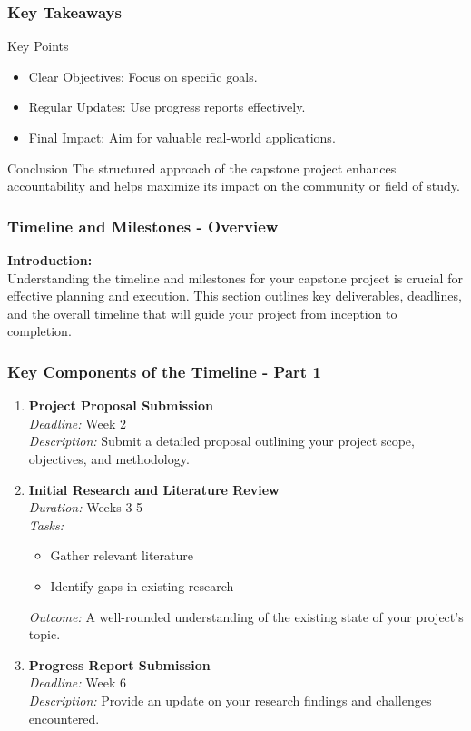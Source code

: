 \documentclass[aspectratio=169]{beamer}
\begin{document}
\begin{frame}[fragile]
    \frametitle{Key Takeaways}
    \begin{block}{Key Points}
        \begin{itemize}
            \item Clear Objectives: Focus on specific goals.
            \item Regular Updates: Use progress reports effectively.
            \item Final Impact: Aim for valuable real-world applications.
        \end{itemize}
    \end{block}
    \begin{block}{Conclusion}
        The structured approach of the capstone project enhances accountability and helps maximize its impact on the community or field of study.
    \end{block}
\end{frame}

\begin{frame}[fragile]
    \frametitle{Timeline and Milestones - Overview}
    \textbf{Introduction:} \\
    Understanding the timeline and milestones for your capstone project is crucial for effective planning and execution. This section outlines key deliverables, deadlines, and the overall timeline that will guide your project from inception to completion.
\end{frame}

\begin{frame}[fragile]
    \frametitle{Key Components of the Timeline - Part 1}
    \begin{enumerate}
        \item \textbf{Project Proposal Submission} \\
        \textit{Deadline:} Week 2 \\
        \textit{Description:} Submit a detailed proposal outlining your project scope, objectives, and methodology.
        
        \item \textbf{Initial Research and Literature Review} \\
        \textit{Duration:} Weeks 3-5 \\
        \textit{Tasks:}
        \begin{itemize}
            \item Gather relevant literature
            \item Identify gaps in existing research
        \end{itemize}
        \textit{Outcome:} A well-rounded understanding of the existing state of your project’s topic.
        
        \item \textbf{Progress Report Submission} \\
        \textit{Deadline:} Week 6 \\
        \textit{Description:} Provide an update on your research findings and challenges encountered.
    \end{enumerate}
\end{frame}
\end{document}
